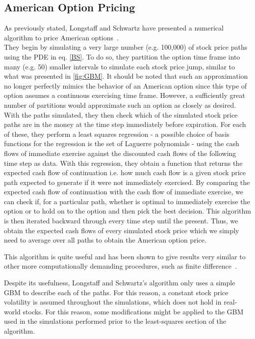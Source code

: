 \documentclass[a4paper,twocolumn,aps,prd,longbibliography,superscriptaddress]{revtex4-1}
\begin{document}
\subsection{American Option Pricing}
As previously stated, Longstaff and Schwartz have presented a numerical algorithm to price American options~\cite{Longstaff}.\\
They begin by simulating a very large number (e.g. 100,000) of stock price paths using the PDE in eq. \eqref{BS}. To do so, they partition the option time frame into many (e.g. 50) smaller intervals to simulate each stock price jump, similar to what was presented in \autoref{fig:GBM}. It should be noted that such an approximation no longer perfectly mimics the behavior of an American option since this type of option assumes a continuous exercising time frame. However, a sufficiently great number of partitions would approximate such an option as closely as desired.\\
With the paths simulated, they then check which of the simulated stock price paths are in the money at the time step immediately before expiration. For each of these, they perform a least squares regression - a possible choice of basis functions for the regression is the set of Laguerre polynomials - using the cash flows of immediate exercise against the discounted cash flows of the following time step as data.
With this regression, they obtain a function that returns the expected cash flow of continuation i.e. how much cash flow is a given stock price path expected to generate if it were not immediately exercised.
By comparing the expected cash flow of continuation with the cash flow of immediate exercise, we can check if, for a particular path, whether is optimal to immediately exercise the option or to hold on to the option and then pick the best decision.
This algorithm is then iterated backward through every time step until the present.
Thus, we obtain the expected cash flows of every simulated stock price which we simply need to average over all paths to obtain the American option price.

This algorithm is quite useful and has been shown to give results very similar to other more computationally demanding procedures, such as finite difference~\cite{Longstaff}.

Despite its usefulness, Longstaff and Schwartz's algorithm only uses a simple GBM to describe each of the paths. For this reason, a constant stock price volatility is assumed throughout the simulations, which does not hold in real-world stocks.
For this reason, some modifications might be applied to the GBM used in the simulations performed prior to the least-squares section of the algorithm.
\end{document}
